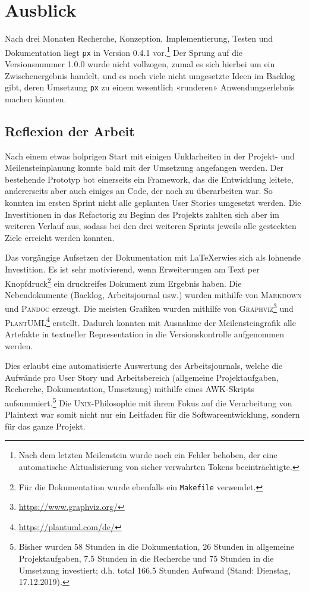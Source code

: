 \section{Ausblick}

Nach drei Monaten Recherche, Konzeption, Implementierung, Testen und Dokumentation liegt \texttt{px} in Version 0.4.1 vor.\footnote{Nach dem letzten Meilenstein wurde noch ein Fehler behoben, der eine automatische Aktualisierung von sicher verwahrten Tokens beeinträchtigte.} Der Sprung auf die Versionsnummer 1.0.0 wurde nicht vollzogen, zumal es sich hierbei um ein Zwischenergebnis handelt, und es noch viele nicht umgesetzte Ideen im Backlog gibt, deren Umsetzung \texttt{px} zu einem wesentlich «runderen» Anwendungserlebnis machen könnten.

\subsection{Reflexion der Arbeit}

Nach einem etwas holprigen Start mit einigen Unklarheiten in der Projekt- und Meilensteinplanung konnte bald mit der Umsetzung angefangen werden. Der bestehende Prototyp bot einerseits ein Framework, das die Entwicklung leitete, andererseits aber auch einiges an Code, der noch zu überarbeiten war. So konnten im ersten Sprint nicht alle geplanten User Stories umgesetzt werden. Die Investitionen in das Refactorig zu Beginn des Projekts zahlten sich aber im weiteren Verlauf aus, sodass bei den drei weiteren Sprints jeweils alle gesteckten Ziele erreicht werden konnten.

Das vorgängige Aufsetzen der Dokumentation mit \LaTeX erwies sich als lohnende Investition. Es ist sehr motivierend, wenn Erweiterungen am Text per Knopfdruck\footnote{Für die Dokumentation wurde ebenfalls ein \texttt{Makefile} verwendet.} ein druckreifes Dokument zum Ergebnis haben. Die Nebendokumente (Backlog, Arbeitsjournal usw.) wurden mithilfe von \textsc{Markdown} und \textsc{Pandoc} erzeugt. Die meisten Grafiken wurden mithilfe von \textsc{Graphviz}\footnote{\url{https://www.graphviz.org/}} und \textsc{PlantUML}\footnote{\url{https://plantuml.com/de/}} erstellt. Dadurch konnten mit Ausnahme der Meilensteingrafik alle Artefakte in textueller Representation in die Versionskontrolle aufgenommen werden.

Dies erlaubt eine automatisierte Auswertung des Arbeitsjournals, welche die Aufwände pro User Story und Arbeitsbereich (allgemeine Projektaufgaben, Recherche, Dokumentation, Umsetzung) mithilfe eines \textsc{AWK}-Skripts aufsummiert.\footnote{Bisher wurden 58 Stunden in die Dokumentation, 26 Stunden in allgemeine Projektaufgaben, 7.5 Stunden in die Recherche und 75 Stunden in die Umsetzung investiert; d.h. total 166.5 Stunden Aufwand (Stand: Dienstag, 17.12.2019).} Die \textsc{Unix}-Philoso\-phie mit ihrem Fokus auf die Verarbeitung von Plaintext war somit nicht nur ein Leitfaden für die Softwareentwicklung, sondern für das ganze Projekt.

